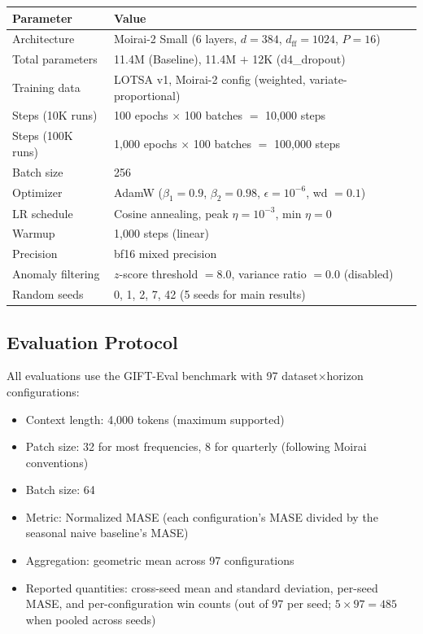\documentclass[11pt]{article}
\theoremstyle{plain}
\theoremstyle{definition}
\theoremstyle{remark}
\newcommand{\HD}{\textsf{d4\_dropout}}
\begin{document}
\begin{center}
\small
\begin{tabular}{ll}
\toprule
\textbf{Parameter} & \textbf{Value} \\
\midrule
Architecture & Moirai-2 Small (6 layers, $d=384$, $d_{\text{ff}}=1024$, $P=16$) \\
Total parameters & 11.4M (Baseline), 11.4M $+$ 12K (\HD{}) \\
Training data & LOTSA v1, Moirai-2 config (weighted, variate-proportional) \\
Steps (10K runs) & 100 epochs $\times$ 100 batches $=$ 10{,}000 steps \\
Steps (100K runs) & 1{,}000 epochs $\times$ 100 batches $=$ 100{,}000 steps \\
Batch size & 256 \\
Optimizer & AdamW ($\beta_1=0.9$, $\beta_2=0.98$, $\epsilon=10^{-6}$, wd $=0.1$) \\
LR schedule & Cosine annealing, peak $\eta = 10^{-3}$, min $\eta = 0$ \\
Warmup & 1{,}000 steps (linear) \\
Precision & bf16 mixed precision \\
Anomaly filtering & $z$-score threshold $=8.0$, variance ratio $=0.0$ (disabled) \\
Random seeds & 0, 1, 2, 7, 42 (5 seeds for main results) \\
\bottomrule
\end{tabular}
\end{center}

\subsection{Evaluation Protocol}

All evaluations use the GIFT-Eval benchmark \citep{vijay2024gifteval} with 97 dataset$\times$horizon configurations:
\begin{itemize}[leftmargin=1.5em]
    \item Context length: 4{,}000 tokens (maximum supported)
    \item Patch size: 32 for most frequencies, 8 for quarterly (following Moirai conventions)
    \item Batch size: 64
    \item Metric: Normalized MASE (each configuration's MASE divided by the seasonal naive baseline's MASE)
    \item Aggregation: geometric mean across 97 configurations
    \item Reported quantities: cross-seed mean and standard deviation, per-seed MASE, and per-configuration win counts (out of 97 per seed; $5 \times 97 = 485$ when pooled across seeds)
\end{itemize}
\end{document}
